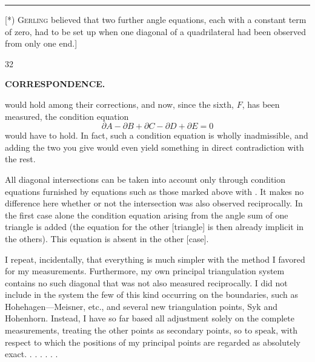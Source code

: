 \par\noindent\rule{4cm}{.4pt}\par
{\footnotesize\noindent\hspace*{\parindent}[*) \textsc{Gerling} believed that two further angle equations, each with a constant term of zero, had to be set up when one diagonal of a quadrilateral had been observed from only one end.]\par}
\hfill{\small 32}\hspace*{.12\linewidth}\par

\par\clearpage
\noindent{}\hfill{\small\textbf{CORRESPONDENCE.}}\hfill\null\par\medskip

\noindent would hold among their corrections, and now, since the sixth, \(F\), has  been measured, the condition equation
\[
 \partial A-\partial B+\partial C-\partial D+\partial E=0
\]
\noindent would have to hold. In fact, such a condition equation is wholly inadmissible, and adding the two you give would even yield something in direct contradiction with the rest.

All diagonal intersections can be taken into account only through  condition equations furnished by equations such as those marked above with \mbox{}. It makes no difference here whether or not the intersection was also observed reciprocally. In the first case alone the condition equation arising from the angle sum of one triangle is added (the equation for the other [triangle] is then already implicit in the others). This equation is absent in the other [case].

I repeat, incidentally, that everything is much simpler with the method I favored for my measurements. Furthermore, my own principal triangulation system contains no such diagonal that was not also measured reciprocally. I did not include in the system the few of this kind occurring on the boundaries, such as Hohehagen—Meisner, etc., and several new triangulation points, Syk and Hohenhorn. Instead, I have so far based all adjustment solely on the complete measurements, treating the other points as secondary points, so to speak, with respect to which the positions of my principal points are regarded as absolutely exact. . . . . . .

